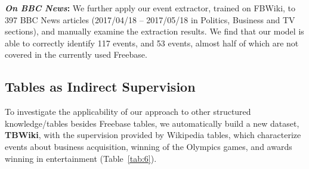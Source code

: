 
\vspace{2mm}\noindent\textbf{\emph{On BBC News}:}
We further apply our event extractor, trained on FBWiki, to 397 BBC News
articles (2017/04/18 -- 2017/05/18 in Politics, Business and TV sections), and manually examine the extraction results. We find that our model is able to correctly identify 117 events, and 53 events,
almost half of which are not covered in the currently used Freebase.



\subsection{Tables as Indirect Supervision}
To investigate the applicability of our approach to other structured knowledge/tables besides Freebase \CVT tables, we automatically build
a new dataset, \textbf{TBWiki}, with the supervision provided by Wikipedia tables, which characterize events about business acquisition,
winning of the Olympics games, and awards winning in entertainment (Table~\ref{tab:6}).

